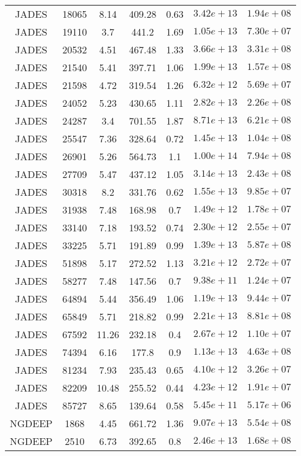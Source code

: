 \begin{table}
\begin{tabular}{ccccccc}
JADES & 18065 & 8.14 & 409.28 & 0.63 & $3.42e+13$ & $1.94e+08$ \\
JADES & 19110 & 3.7 & 441.2 & 1.69 & $1.05e+13$ & $7.30e+07$ \\
JADES & 20532 & 4.51 & 467.48 & 1.33 & $3.66e+13$ & $3.31e+08$ \\
JADES & 21540 & 5.41 & 397.71 & 1.06 & $1.99e+13$ & $1.57e+08$ \\
JADES & 21598 & 4.72 & 319.54 & 1.26 & $6.32e+12$ & $5.69e+07$ \\
JADES & 24052 & 5.23 & 430.65 & 1.11 & $2.82e+13$ & $2.26e+08$ \\
JADES & 24287 & 3.4 & 701.55 & 1.87 & $8.71e+13$ & $6.21e+08$ \\
JADES & 25547 & 7.36 & 328.64 & 0.72 & $1.45e+13$ & $1.04e+08$ \\
JADES & 26901 & 5.26 & 564.73 & 1.1 & $1.00e+14$ & $7.94e+08$ \\
JADES & 27709 & 5.47 & 437.12 & 1.05 & $3.14e+13$ & $2.43e+08$ \\
JADES & 30318 & 8.2 & 331.76 & 0.62 & $1.55e+13$ & $9.85e+07$ \\
JADES & 31938 & 7.48 & 168.98 & 0.7 & $1.49e+12$ & $1.78e+07$ \\
JADES & 33140 & 7.18 & 193.52 & 0.74 & $2.30e+12$ & $2.55e+07$ \\
JADES & 33225 & 5.71 & 191.89 & 0.99 & $1.39e+13$ & $5.87e+08$ \\
JADES & 51898 & 5.17 & 272.52 & 1.13 & $3.21e+12$ & $2.72e+07$ \\
JADES & 58277 & 7.48 & 147.56 & 0.7 & $9.38e+11$ & $1.24e+07$ \\
JADES & 64894 & 5.44 & 356.49 & 1.06 & $1.19e+13$ & $9.44e+07$ \\
JADES & 65849 & 5.71 & 218.82 & 0.99 & $2.21e+13$ & $8.81e+08$ \\
JADES & 67592 & 11.26 & 232.18 & 0.4 & $2.67e+12$ & $1.10e+07$ \\
JADES & 74394 & 6.16 & 177.8 & 0.9 & $1.13e+13$ & $4.63e+08$ \\
JADES & 81234 & 7.93 & 235.43 & 0.65 & $4.10e+12$ & $3.26e+07$ \\
JADES & 82209 & 10.48 & 255.52 & 0.44 & $4.23e+12$ & $1.91e+07$ \\
JADES & 85727 & 8.65 & 139.64 & 0.58 & $5.45e+11$ & $5.17e+06$ \\
NGDEEP & 1868 & 4.45 & 661.72 & 1.36 & $9.07e+13$ & $5.54e+08$ \\
NGDEEP & 2510 & 6.73 & 392.65 & 0.8 & $2.46e+13$ & $1.68e+08$ \\

\end{tabular}
\end{table}
